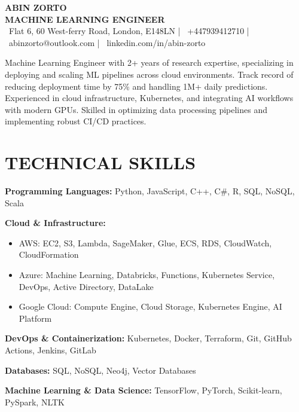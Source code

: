 \documentclass[10pt,a4paper]{article}
\begin{document}

\begin{center}
    {\color{primary}\Large\textbf{ABIN ZORTO}}\\[0.2em]
    {\color{secondary}\large\textbf{MACHINE LEARNING ENGINEER}}\\[0.3em]
    
    \small\color{secondary}
    \faMapMarker\ Flat 6, 60 West-ferry Road, London, E148LN |
    \faMobile\ +447939412710 |
    \faEnvelope\ abinzorto@outlook.com |
    \faLinkedin\ linkedin.com/in/abin-zorto
\end{center}

{\color{secondary}
Machine Learning Engineer with 2+ years of research expertise, specializing in deploying and scaling ML pipelines across cloud environments. Track record of reducing deployment time by 75\% and handling 1M+ daily predictions. Experienced in cloud infrastructure, Kubernetes, and integrating AI workflows with modern GPUs. Skilled in optimizing data processing pipelines and implementing robust CI/CD practices.
}

\section*{TECHNICAL SKILLS}
\textbf{Programming Languages:} Python, JavaScript, C++, C\#, R, SQL, NoSQL, Scala

\textbf{Cloud \& Infrastructure:}
\begin{itemize}
    \item AWS: EC2, S3, Lambda, SageMaker, Glue, ECS, RDS, CloudWatch, CloudFormation
    \item Azure: Machine Learning, Databricks, Functions, Kubernetes Service, DevOps, Active Directory, DataLake
    \item Google Cloud: Compute Engine, Cloud Storage, Kubernetes Engine, AI Platform
\end{itemize}

\textbf{DevOps \& Containerization:} Kubernetes, Docker, Terraform, Git, GitHub Actions, Jenkins, GitLab

\textbf{Databases:} SQL, NoSQL, Neo4j, Vector Databases

\textbf{Machine Learning \& Data Science:} TensorFlow, PyTorch, Scikit-learn, PySpark, NLTK
\end{document}
